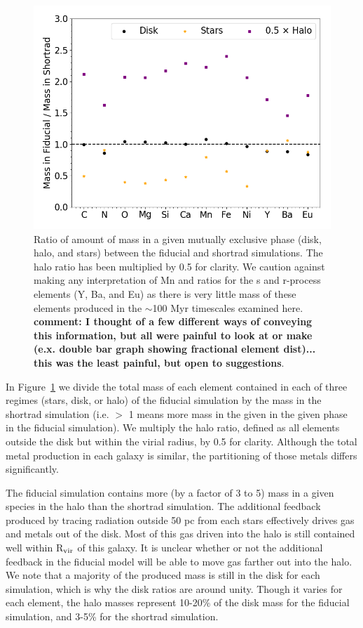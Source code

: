 \documentclass[twocolumn]{aastex61}
\begin{document}
\begin{figure}
\includegraphics[width=0.9\linewidth]{element_mass_comparison_fraction}
\caption{Ratio of amount of mass in a given mutually exclusive phase (disk, halo, and stars) between the fiducial and shortrad simulations. The halo ratio has been multiplied by 0.5 for clarity. We caution against making any interpretation of Mn and ratios for the s and r-process elements (Y, Ba, and Eu) as there is very little mass of these elements produced in the $\sim$100 Myr timescales examined here. \textbf{comment: I thought of a few different ways of conveying this information, but all were painful to look at or make (e.x. double bar graph showing fractional element dist)... this was the least painful, but open to suggestions}.}
\label{fig:element mass ratio}
\end{figure}

In Figure~\ref{fig:element mass ratio} we divide the total mass of each element contained in each of three regimes (stars, disk, or halo) of the fiducial simulation by the mass in the shortrad simulation (i.e. $>$ 1 means more mass in the given in the given phase in the fiducial simulation). We multiply the halo ratio, defined as all elements outside the disk but within the virial radius, by 0.5 for clarity. Although the total metal production in each galaxy is similar, the partitioning of those metals differs significantly.

The fiducial simulation contains more (by a factor of 3 to 5) mass in a given species in the halo than the shortrad simulation. The additional feedback produced by tracing radiation outside 50 pc from each stars effectively drives gas and metals out of the disk. Most of this gas driven into the halo is still contained well within R$_{\rm vir}$ of this galaxy. It is unclear whether or not the additional feedback in the fiducial model will be able to move gas farther out into the halo. We note that a majority of the produced mass is still in the disk for each simulation, which is why the disk ratios are around unity. Though it varies for each element, the halo masses represent 10-20\% of the disk mass for the fiducial simulation, and 3-5\% for the shortrad simulation. 
\end{document}
